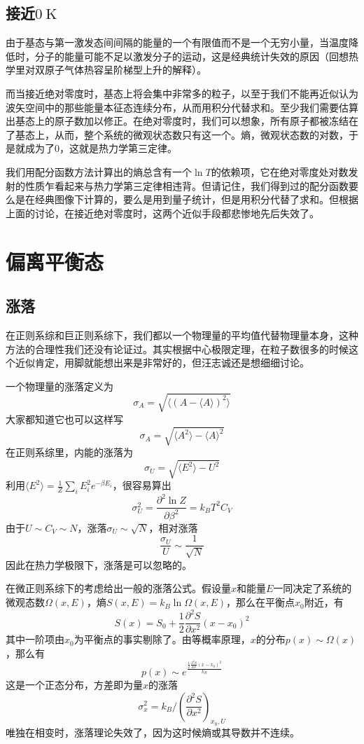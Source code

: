 \documentclass[a4paper,11pt]{ctexart}
\newcommand{\beq}{\begin{equation}}
\newcommand{\eeq}{\end{equation}}
\begin{document}
\subsection{接近$0\mathrm{\ K}$}
由于基态与第一激发态间间隔的能量的一个有限值而不是一个无穷小量，当温度降低时，分子的能量可能不足以激发分子的运动，这是经典统计失效的原因（回想热学里对双原子气体热容呈阶梯型上升的解释）。\par
而当接近绝对零度时，基态上将会集中非常多的粒子，以至于我们不能再近似认为波矢空间中的那些能量本征态连续分布，从而用积分代替求和。至少我们需要估算出基态上的原子数加以修正。在绝对零度时，我们可以想象，所有原子都被冻结在了基态上，从而，整个系统的微观状态数只有这一个。熵，微观状态数的对数，于是就成为了0，这就是热力学第三定律。\par
我们用配分函数方法计算出的熵总含有一个$\ln T$的依赖项，它在绝对零度处对数发射的性质乍看起来与热力学第三定律相违背。但请记住，我们得到过的配分函数要么是在经典图像下计算的，要么是用到量子统计，但是用积分代替了求和。但根据上面的讨论，在接近绝对零度时，这两个近似手段都悲惨地先后失效了。

\section{偏离平衡态}

\subsection{涨落}
在正则系综和巨正则系综下，我们都以一个物理量的平均值代替物理量本身，这种方法的合理性我们还没有论证过。其实根据中心极限定理，在粒子数很多的时候这个近似肯定，用脚就能想出来是非常好的，但汪志诚还是想细细讨论。\par
一个物理量的涨落定义为
\beq
\sigma_A = \sqrt{\langle (A - \langle A \rangle )^2 \rangle }
\eeq
大家都知道它也可以这样写
\beq
\sigma_A = \sqrt{\langle A^2 \rangle - \langle A \rangle^2 }
\eeq
在正则系综里，内能的涨落为
\beq
\sigma_U = \sqrt{\langle E^2 \rangle - U^2}
\eeq
利用$\langle E^2 \rangle = \frac{1}{Z} \sum_i E_i^2 e^{-\beta E_i}$，很容易算出
\beq
\sigma_U^2 = \frac{\partial^2 \ln Z}{\partial \beta^2} = k_B T^2 C_V
\eeq
由于$U \sim C_V \sim N$，涨落$\sigma_U \sim \sqrt{N}$，相对涨落\beq 
\frac{\sigma_U}{U} \sim \frac{1}{\sqrt{N}} 
\eeq
因此在热力学极限下，涨落是可以忽略的。
\par
在微正则系综下的考虑给出一般的涨落公式。假设量$x$和能量$E$一同决定了系统的微观态数$\varOmega(x,E)$，熵$S(x,E) = k_B \ln \varOmega(x,E)$，那么在平衡点$x_0$附近，有
\beq
S(x) = S_0 + \frac{1}{2} \frac{\partial^2 S}{\partial x^2} (x-x_0)^2
\eeq
其中一阶项由$x_0$为平衡点的事实剔除了。由等概率原理，$x$的分布$p(x) \sim \varOmega(x)$，那么有
\beq
p(x) \sim e^{\frac{\frac{1}{2} \frac{\partial^2 S}{\partial x^2} (x-x_0)^2}{k_B}}
\eeq
这是一个正态分布，方差即为量$x$的涨落
\beq
\sigma_x^2 = k_B / \left( \frac{\partial^2 S}{\partial x^2}\right)_{x_0,U}
\eeq
唯独在相变时，涨落理论失效了，因为这时候熵或其导数并不连续。
\end{document}
